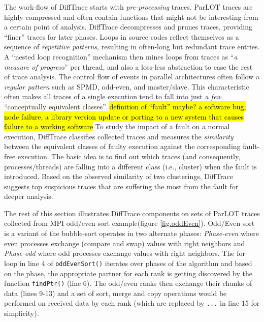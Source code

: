 The work-flow of DiffTrace starts with \textit{pre-processing} traces. ParLOT traces are highly compressed and often contain functions that might not be interesting from a certain point of analysis. DiffTrace decompresses and prunes traces, providing ``finer'' traces for later phases.  
%
Loops in source codes reflect themselves as a sequence of \textit{repetitive patterns}, resulting in often-long but redundant trace entries. A ``nested loop recognition'' mechanism then mines loops from traces as ``\textit{a measure of progress}'' per thread, and also a loss-less abstraction to ease the rest of trace analysis.
%
The control flow of events in parallel architectures often follow a \textit{regular pattern} such as SPMD, odd-even, and master/slave. This characteristic often makes all traces of a single execution tend to fall into just \textit{a few} ``conceptually equivalent classes''. 
%
%
\hl{definition of ``fault'' maybe? a software bug, node failure, a library version update or porting to a new system that causes failure to a working software }
To study the impact of a fault on a normal execution, DiffTrace classifies collected traces and measures the \textit{similarity} between the equivalent classes of faulty execution against the corresponding fault-free execution.
%
The basic idea is to find out which traces (and consequently, processes/threads) are falling into a different class (i.e., cluster) when the fault is introduced.
%
Based on the observed similarity of two clusterings, DiffTrace suggests top suspicious traces that are suffering the most from the fault for deeper analysis.
%

The rest of this section illustrates DiffTrace components on sets of ParLOT traces collected from MPI odd/even sort example(figure \ref{fig.oddEven}).
Odd/Even sort is a variant of the bubble-sort operates in two alternate phases: \textit{Phase-even} where even processes exchange (compare and swap) values with right neighbors and \textit{Phase-odd} where odd processes exchange values with right neighbors. The for loop in line 4 of \texttt{oddEvenSort()} iterates over phases of the algorithm and based on the phase, the appropriate partner for each rank is getting discovered by the function \texttt{findPtr()} (line 6). The odd/even ranks then exchange their chunks of data (lines 9-13) and a set of sort, merge and copy operations would be performed on received data by each rank (which are replaced by \texttt{...} in line 15 for simplicity).

